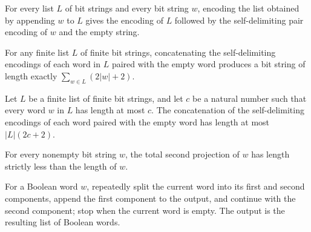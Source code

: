 \begin{theorem}
\label{Complexity.BinArith.encWords_append_singleton}
\leanok
{}
For every list $L$ of bit strings and every bit string $w$, encoding the list obtained
by appending $w$ to $L$ gives the encoding of $L$ followed by the self-delimiting pair
encoding of $w$ and the empty string.
\end{theorem}

\begin{theorem}
\label{Complexity.BinArith.length_encWords}
\leanok
{}
For any finite list $L$ of finite bit strings, concatenating the self-delimiting
encodings of each word in $L$ paired with the empty word produces a bit string of length
exactly $\sum_{w\in L}(2|w|+2)$.
\end{theorem}

\begin{theorem}
\label{Complexity.BinArith.length_encWords_le}
\leanok
{}
Let $L$ be a finite list of finite bit strings, and let $c$ be a natural number such
that every word $w$ in $L$ has length at most $c$. The concatenation of the
self-delimiting encodings of each word paired with the empty word has length at most
$|L|(2c+2)$.
\end{theorem}

\begin{theorem}
\label{Complexity.BinArith.length_pairSndD_lt}
\leanok
{}
For every nonempty bit string $w$, the total second projection of $w$ has length
strictly less than the length of $w$.
\end{theorem}

\begin{definition}
\label{Complexity.BinArith.decWords}
\leanok
{}
For a Boolean word $w$, repeatedly split the current word into its first and second
components, append the first component to the output, and continue with the second
component; stop when the current word is empty. The output is the resulting list of
Boolean words.
\end{definition}

